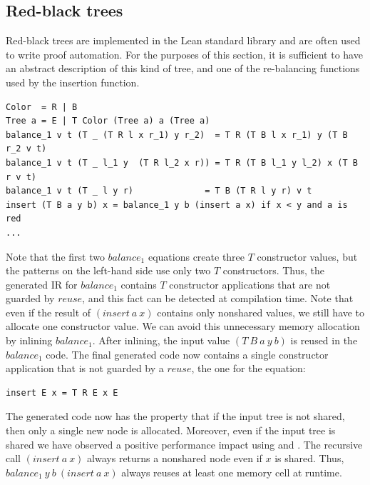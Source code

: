 \subsection*{Red-black trees}
Red-black trees are implemented in the Lean standard
library and are often used to write proof automation.
For the purposes of this section, it is sufficient to have
an abstract description of this kind of tree, and one of the re-balancing functions used by the insertion
function.
\begin{lstlisting}
Color  = R | B
Tree a = E | T Color (Tree a) a (Tree a)
balance_1 v t (T _ (T R l x r_1) y r_2)  = T R (T B l x r_1) y (T B r_2 v t)
balance_1 v t (T _ l_1 y  (T R l_2 x r)) = T R (T B l_1 y l_2) x (T B r v t)
balance_1 v t (T _ l y r)              = T B (T R l y r) v t
insert (T B a y b) x = balance_1 y b (insert a x) if x < y and a is red
...
\end{lstlisting}
Note that the first two $\textit{balance}_1$ equations create three $T$ constructor values, but the patterns on the
left-hand side use only two $T$ constructors. Thus, the generated IR for $\textit{balance}_1$ contains $T$ constructor
applications that are not guarded by $\textit{reuse}$, and this fact can be detected at compilation time.
Note that even if the result of $(\textit{insert}\ a\ x)$ contains only nonshared values, we still have to allocate one
constructor value. We can avoid this unnecessary memory allocation by inlining $\textit{balance}_1$.
After inlining, the input value $(T\ B\ a\ y\ b)$ is reused in the $\textit{balance}_1$ code.
The final generated code now contains a single constructor application that is not guarded by a $\textit{reuse}$, the one for
the equation:
\begin{lstlisting}
insert E x = T R E x E
\end{lstlisting}
The generated code now has the property that if the input tree is not shared, then only a single new node is allocated.
Moreover, even if the input tree is shared we have observed a positive performance impact using  and .
The recursive call $(\textit{insert}\ a\ x)$ always returns a nonshared node even if $x$ is shared. Thus,
$\textit{balance}_1\ y\ b\ (\textit{insert}\ a\ x)$ always reuses at least one memory cell at runtime.

